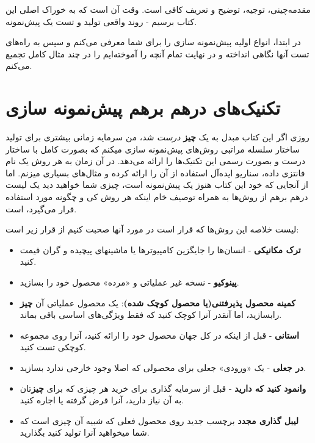 مقدمه‌چینی، توجیه، توضیح و تعریف کافی است. وقت آن است که به خوراک اصلی
این کتاب برسیم - روند واقعی تولید و تست یک پیش‌نمونه.

در ابتدا، انواع اولیه پیش‌نمونه سازی را برای شما معرفی می‌کنم و سپس به
راه‌های تست آنها نگاهی انداخته و در نهایت تمام آنچه را آموخته‌ایم را در
چند مثال کامل تجمیع می‌کنم.

\section{تکنیک‌های درهم برهم پیش‌نمونه
سازی}\label{ux62aux6a9ux646ux6ccux6a9ux647ux627ux6cc-ux62fux631ux647ux645-ux628ux631ux647ux645-ux67eux6ccux634ux646ux645ux648ux646ux647-ux633ux627ux632ux6cc}

روزی اگر این کتاب مبدل به یک \textbf{چیز} \emph{درست} شد، من سرمایه
زمانی بیشتری برای تولید ساختار سلسله مراتبی روش‌های پیش‌نمونه سازی میکنم
که بصورت کامل با ساختار درست و بصورت رسمی این تکنیک‌ها را ارائه می‌دهد.
در آن زمان به هر روش یک نام فانتزی داده، سناریو ایده‌آل استفاده از آن را
ارائه کرده و مثال‌های بسیاری میزنم. اما از آنجایی که خود این کتاب هنوز
یک پیش‌نمونه است، چیزی شما خواهید دید یک لیست درهم برهم از روش‌ها به
همراه توصیف خام اینکه هر روش کی و چگونه مورد استفاده قرار می‌گیرد، است.

لیست خلاصه این روش‌ها که قرار است در مورد آنها صحبت کنیم از قرار زیر
است:

\begin{itemize}
\item
  \textbf{ترک مکانیکی} - انسان‌ها را جایگزین کامپیوترها یا ماشینهای
  پیچیده و گران قیمت کنید.
\item
  \textbf{پینوکیو} - نسخه غیر عملیاتی و «مرده» محصول خود را بسازید.
\item
  \textbf{کمینه محصول پذیرفتنی(یا محصول کوچک شده)}: یک محصول عملیاتی آن
  \textbf{چیز} رابسازید، اما آنقدر آنرا کوچک کنید که فقط ویژگی‌‌های
  اساسی باقی بماند.
\item
  \textbf{استانی} - قبل از اینکه در کل جهان محصول خود را ارائه کنید،
  آنرا روی مجموعه کوچکی تست کنید.
\item
  \textbf{در جعلی} - یک «ورودی» جعلی برای محصولی که اصلا وجود خارجی
  ندارد بسازید.
\item
  \textbf{وانمود کنید که دارید} - قبل از سرمایه گذاری برای خرید هر چیزی
  که برای \textbf{چیز}تان به آن نیاز دارید، آنرا قرض گرفته یا اجاره
  کنید.
\item
  \textbf{لیبل گذاری مجدد} برچسب جدید روی محصول فعلی که شبیه آن چیزی است
  که شما میخواهید آنرا تولید کنید بگذارید.
\end{itemize}

